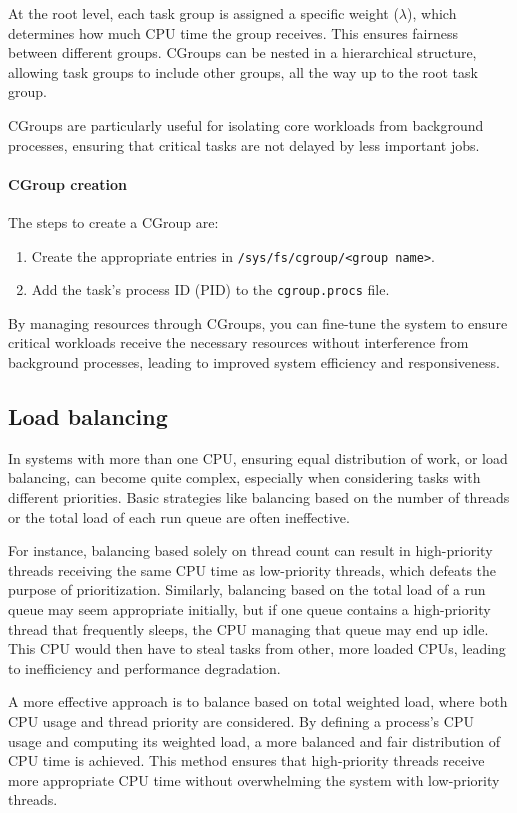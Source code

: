 At the root level, each task group is assigned a specific weight ($\lambda$), which determines how much CPU time the group receives. 
This ensures fairness between different groups. CGroups can be nested in a hierarchical structure, allowing task groups to include other groups, all the way up to the root task group.

CGroups are particularly useful for isolating core workloads from background processes, ensuring that critical tasks are not delayed by less important jobs.

\paragraph*{CGroup creation}
The steps to create a CGroup are: 
\begin{enumerate}
    \item Create the appropriate entries in \texttt{/sys/fs/cgroup/<group name>}.
    \item Add the task's process ID (PID) to the \texttt{cgroup.procs} file.
\end{enumerate}
By managing resources through CGroups, you can fine-tune the system to ensure critical workloads receive the necessary resources without interference from background processes, leading to improved system efficiency and responsiveness.

\subsection{Load balancing}
In systems with more than one CPU, ensuring equal distribution of work, or load balancing, can become quite complex, especially when considering tasks with different priorities. 
Basic strategies like balancing based on the number of threads or the total load of each run queue are often ineffective.

For instance, balancing based solely on thread count can result in high-priority threads receiving the same CPU time as low-priority threads, which defeats the purpose of prioritization. 
Similarly, balancing based on the total load of a run queue may seem appropriate initially, but if one queue contains a high-priority thread that frequently sleeps, the CPU managing that queue may end up idle. 
This CPU would then have to steal tasks from other, more loaded CPUs, leading to inefficiency and performance degradation.

A more effective approach is to balance based on total weighted load, where both CPU usage and thread priority are considered.
By defining a process's CPU usage and computing its weighted load, a more balanced and fair distribution of CPU time is achieved. 
This method ensures that high-priority threads receive more appropriate CPU time without overwhelming the system with low-priority threads.

